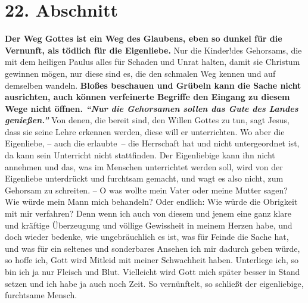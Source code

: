 \section{22. Abschnitt} \label{kap4_ab22}

 \label{ref:04_22_vernunft}
\textbf{Der Weg Gottes ist ein Weg des Glaubens, eben so dunkel für die
Vernunft, als
tödlich für die Eigenliebe.} Nur die Kinder!des Gehorsams,
 die mit dem heiligen
Paulus alles für Schaden und Unrat halten, damit sie Christum gewinnen mögen,
nur diese sind es, die den schmalen Weg kennen und auf demselben wandeln.
\textbf{Bloßes
beschauen und Grübeln kann die Sache nicht ausrichten, auch können verfeinerte
Begriffe den Eingang zu diesem Wege nicht öffnen.
\textit{"`Nur die Gehorsamen sollen das Gute des Landes
genießen."'}}
Von denen, die bereit sind,
den Willen Gottes zu tun, sagt Jesus, dass sie seine Lehre erkennen
werden,
diese will er unterrichten. Wo aber die Eigenliebe,
-- auch die erlaubte~-- die Herrschaft hat und nicht untergeordnet ist, da kann
sein Unterricht nicht stattfinden. Der Eigenliebige kann ihn nicht annehmen und
das, was im Menschen unterrichtet werden soll, wird von der Eigenliebe
unterdrückt und furchtsam gemacht, und wagt es also nicht, zum Gehorsam zu
schreiten. -- O was wollte mein Vater oder meine Mutter sagen? Wie würde mein
Mann mich behandeln? Oder endlich: Wie würde die Obrigkeit mit mir verfahren?
Denn wenn ich auch von diesem und jenem eine ganz klare und kräftige
Überzeugung und völlige Gewissheit in meinem Herzen habe, und doch wieder
bedenke, wie ungebräuchlich es ist, was für Feinde die Sache hat, und was für
ein seltenes und sonderbares Ansehen ich mir dadurch geben würde, so hoffe ich,
Gott wird Mitleid mit meiner Schwachheit haben. Unterliege ich, so bin ich ja
nur Fleisch und Blut. Vielleicht wird Gott mich später besser in Stand
setzen und ich habe ja auch noch Zeit. So vernünftelt, so schließt der
eigenliebige, furchtsame Mensch.

\medskip

